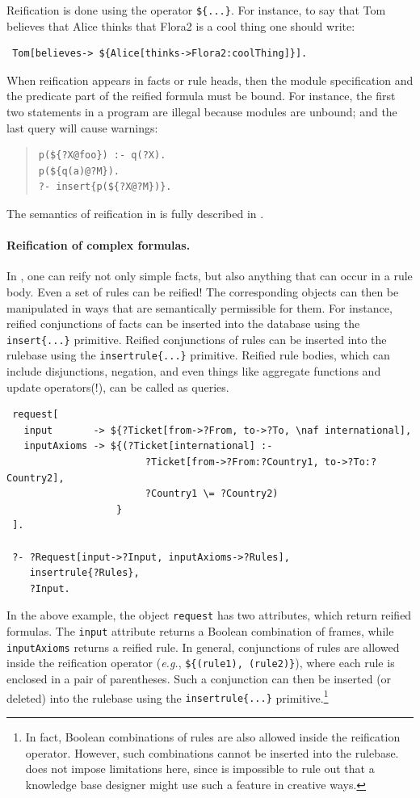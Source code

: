 \documentclass[11pt]{article}
\newcommand{\ERGO}{\mbox{\smaller{\ensuremath{\cal{E}}\smaller{{\sc{RGO}}}}}\xspace}
\newcommand{\FLSYSTEM}{\ERGO}
\begin{document}
Reification is done using the operator {\tt \$\{...\}}. For instance, to
say that Tom believes that Alice thinks that Flora2 is a
cool thing one should write:
\begin{verbatim}
 Tom[believes-> ${Alice[thinks->Flora2:coolThing]}].
\end{verbatim}

When reification appears in facts or rule heads, then the module
specification and the predicate part of the reified formula must be bound.
For instance, the first two statements in a program
are illegal because modules are
unbound; and the last query will cause warnings:
\begin{quote}
\begin{verbatim}
p(${?X@foo}) :- q(?X).
p(${q(a)@?M}).
?- insert{p(${?X@?M})}. 
\end{verbatim}
\end{quote}

\noindent
The semantics of reification in \FLSYSTEM is fully described in
\cite{reification-data-semantics-03}.

\paragraph{Reification of complex formulas.}
In \FLSYSTEM, one can reify not only simple facts, but also anything that
can occur in a rule body. Even a set of rules can be reified!
The corresponding objects can then be manipulated in ways that are semantically
permissible for them. For instance, reified conjunctions of facts can be
inserted into the database using the \verb|insert{...}| primitive. 
Reified conjunctions of rules can be inserted into the rulebase using the
\verb|insertrule{...}| primitive. Reified rule bodies, which can include
disjunctions, negation, and even things like aggregate functions and update
operators(!), can be called as queries.
\begin{verbatim}
 request[
   input       -> ${?Ticket[from->?From, to->?To, \naf international],
   inputAxioms -> ${(?Ticket[international] :-
                        ?Ticket[from->?From:?Country1, to->?To:?Country2],
                        ?Country1 \= ?Country2)
                   }
 ].

 ?- ?Request[input->?Input, inputAxioms->?Rules],
    insertrule{?Rules},
    ?Input.
\end{verbatim}

In the above example, the object {\tt request} has two attributes, which
return reified formulas. The {\tt input} attribute returns a Boolean
combination of frames, while {\tt inputAxioms} returns a reified rule.
In general, conjunctions of rules are allowed inside the reification
operator ({\it e.g.}, \verb|${(rule1), (rule2)}|), where each rule is
enclosed in a pair of parentheses. Such a conjunction can then be inserted
(or deleted) into the rulebase using the {\tt insertrule\{...\}}
primitive.\footnote{
  In fact, Boolean combinations of rules are also allowed inside the
  reification operator. However, such combinations cannot be inserted into
  the rulebase. \FLSYSTEM does not impose limitations here, since is
  impossible to rule out that a knowledge base designer might use such a
  feature in creative ways.
}
\end{document}
